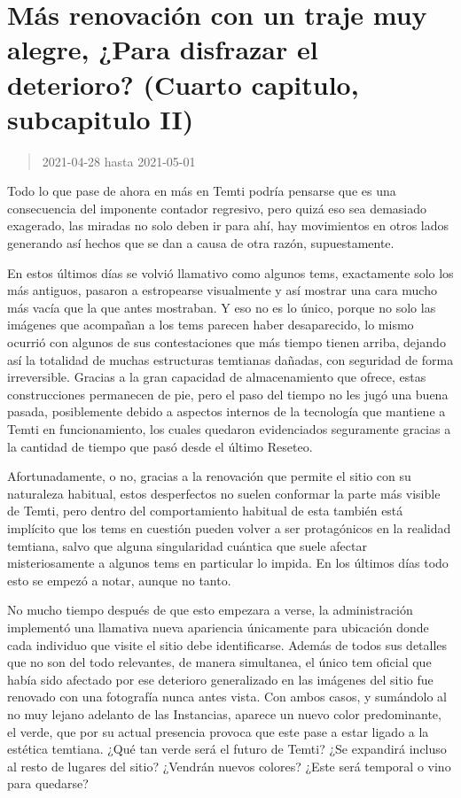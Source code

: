 \documentclass[
  spanish,
]{book}
\begin{document}
\hypertarget{muxe1s-renovaciuxf3n-con-un-traje-muy-alegre-para-disfrazar-el-deterioro-cuarto-capitulo-subcapitulo-ii}{%
\section{Más renovación con un traje muy alegre, ¿Para disfrazar el deterioro? (Cuarto capitulo, subcapitulo II)}\label{muxe1s-renovaciuxf3n-con-un-traje-muy-alegre-para-disfrazar-el-deterioro-cuarto-capitulo-subcapitulo-ii}}

\begin{quote}
2021-04-28 hasta 2021-05-01
\end{quote}

Todo lo que pase de ahora en más en Temti podría pensarse que es una consecuencia del imponente contador regresivo, pero quizá eso sea demasiado exagerado, las miradas no solo deben ir para ahí, hay movimientos en otros lados generando así hechos que se dan a causa de otra razón, supuestamente.

En estos últimos días se volvió llamativo como algunos tems, exactamente solo los más antiguos, pasaron a estropearse visualmente y así mostrar una cara mucho más vacía que la que antes mostraban. Y eso no es lo único, porque no solo las imágenes que acompañan a los tems parecen haber desaparecido, lo mismo ocurrió con algunos de sus contestaciones que más tiempo tienen arriba, dejando así la totalidad de muchas estructuras temtianas dañadas, con seguridad de forma irreversible.
Gracias a la gran capacidad de almacenamiento que ofrece, estas construcciones permanecen de pie, pero el paso del tiempo no les jugó una buena pasada, posiblemente debido a aspectos internos de la tecnología que mantiene a Temti en funcionamiento, los cuales quedaron evidenciados seguramente gracias a la cantidad de tiempo que pasó desde el último Reseteo.

Afortunadamente, o no, gracias a la renovación que permite el sitio con su naturaleza habitual, estos desperfectos no suelen conformar la parte más visible de Temti, pero dentro del comportamiento habitual de esta también está implícito que los tems en cuestión pueden volver a ser protagónicos en la realidad temtiana, salvo que alguna singularidad cuántica que suele afectar misteriosamente a algunos tems en particular lo impida. En los últimos días todo esto se empezó a notar, aunque no tanto.

No mucho tiempo después de que esto empezara a verse, la administración implementó una llamativa nueva apariencia únicamente para ubicación donde cada individuo que visite el sitio debe identificarse. Además de todos sus detalles que no son del todo relevantes, de manera simultanea, el único tem oficial que había sido afectado por ese deterioro generalizado en las imágenes del sitio fue renovado con una fotografía nunca antes vista.
Con ambos casos, y sumándolo al no muy lejano adelanto de las Instancias, aparece un nuevo color predominante, el verde, que por su actual presencia provoca que este pase a estar ligado a la estética temtiana. ¿Qué tan verde será el futuro de Temti? ¿Se expandirá incluso al resto de lugares del sitio? ¿Vendrán nuevos colores? ¿Este será temporal o vino para quedarse?
\end{document}

